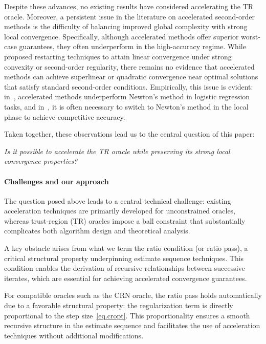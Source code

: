 \documentclass{article}
\begin{document}
Despite these advances, no existing results have considered accelerating the TR oracle. Moreover, a persistent issue in the literature on accelerated second-order methods is the difficulty of balancing improved global complexity with strong local convergence. Specifically, although accelerated methods offer superior worst-case guarantees, they often underperform in the high-accuracy regime. While \citet[Sections 4.2.5–4.2.6]{nesterov_lectures_2018} proposed restarting techniques to attain linear convergence under strong convexity or second-order regularity, there remains no evidence that accelerated methods can achieve superlinear or quadratic convergence near optimal solutions that satisfy standard second-order conditions. Empirically, this issue is evident: in~\cite{carmon2022optimal}, accelerated methods underperform Newton’s method in logistic regression tasks, and in~\cite{jiang2020unified,huang2024inexact}, it is often necessary to switch to Newton’s method in the local phase to achieve competitive accuracy.

Taken together, these observations lead us to the central question of this paper:
\begin{center}
\emph{Is it possible to accelerate the TR oracle while preserving its strong local convergence properties?}
\end{center}

\paragraph{Challenges and our approach}
The question posed above leads to a central technical challenge: existing acceleration techniques are primarily developed for unconstrained oracles, whereas trust-region (TR) oracles impose a ball constraint that substantially complicates both algorithm design and theoretical analysis.

A key obstacle arises from what we term the ratio condition (or ratio pass), a critical structural property underpinning estimate sequence techniques. This condition enables the derivation of recursive relationships between successive iterates, which are essential for achieving accelerated convergence guarantees.

For compatible oracles such as the CRN oracle, the ratio pass holds automatically due to a favorable structural property: the regularization term is directly proportional to the step size~\eqref{eq.cropt}. This proportionality ensures a smooth recursive structure in the estimate sequence and facilitates the use of acceleration techniques without additional modifications.
\end{document}
